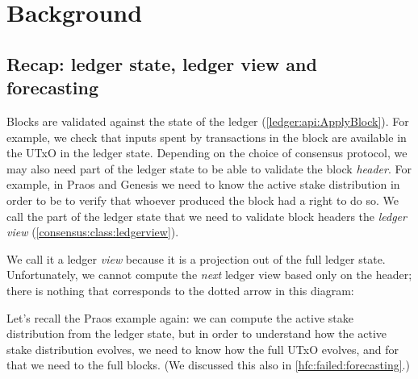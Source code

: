 \section{Background}

\subsection{Recap: ledger state, ledger view and forecasting}

Blocks are validated against the state of the ledger
(\cref{ledger:api:ApplyBlock}). For example, we check that inputs spent by
transactions in the block are available in the UTxO in the ledger state.
Depending on the choice of consensus protocol, we may also need part of the
ledger state to be able to validate the block \emph{header}. For example, in
Praos and Genesis we need to know the active stake distribution in order to be
to verify that whoever produced the block had a right to do so. We call the part
of the ledger state that we need to validate block headers the \emph{ledger
view} (\cref{consensus:class:ledgerview}).

We call it a ledger \emph{view} because it is a projection out of the full
ledger state. Unfortunately, we cannot compute the \emph{next} ledger view based only
on the header; there is nothing that corresponds to the dotted arrow in this
diagram:
%
\begin{center}
\end{center}
%
Let's recall the Praos example again: we can compute the active stake
distribution from the ledger state, but in order to understand how the active
stake distribution evolves, we need to know how the full UTxO evolves, and for
that we need to the full blocks. (We discussed this also in
\cref{hfc:failed:forecasting}.)

